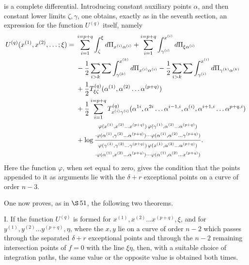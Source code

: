 \documentclass[10pt]{article}
\begin{document}
is a complete differential. Introducing constant auxiliary points \(\alpha\), and then constant lower limits \(\zeta,\gamma\), one obtains, exactly as in the seventh section, an expression for the function \(U^{(q)}\) itself, namely
\[
\begin{aligned}
U^{(q)}(x^{(1)},x^{(2)},\ldots;\xi)
={}&
\sum_{i=1}^{i=p+q}\int_{\zeta}^{\xi}d\Pi_{x^{(i)}\alpha^{(i)}}
+\sum_{i=1}^{i=p+q}\int_{\gamma^{(i)}}^{x^{(i)}}d\Pi_{\xi\alpha^{(i)}}\\
&-\frac12\sum_{i>k}\sum\int_{\gamma^{(k)}}^{x^{(k)}}d\Pi_{x^{(i)}\alpha^{(i)}}
-\frac12\sum_{i>k}\sum\int_{\gamma^{(i)}}^{x^{(i)}}d\Pi_{\gamma^{(k)}\alpha^{(k)}}\\
&+\frac12 T_{\xi\zeta}^{(q)}(\alpha^{(1)},\alpha^{(2)}\ldots\alpha^{(p+q)})\\
&+\frac12\sum_{i=1}^{i=p+q}
T_{x^{(i)}\gamma^{(i)}}^{(q)}
(\alpha^{1i},\alpha^{2i}\ldots\alpha^{i-1,i},\alpha^{(i)},\alpha^{i+1,i}\ldots\alpha^{p+q,i})\\
&+\log\frac{%
\begin{gathered}\scriptstyle
\varphi(x^{(1)},x^{(2)}\ldots x^{(p+q)})\,
\varphi(\gamma^{(1)},\alpha^{(2)}\ldots\alpha^{(p+q)})\\[-0.15em]
\scriptstyle{}\cdot
\varphi(\alpha^{(1)},\gamma^{(2)}\ldots\alpha^{(p+q)})\cdots
\varphi(\alpha^{(1)},\alpha^{(2)}\ldots\gamma^{(p+q)})
\end{gathered}}{%
\begin{gathered}\scriptstyle
\varphi(\gamma^{(1)},\gamma^{(2)}\ldots\gamma^{(p+q)})\,
\varphi(x^{(1)},\alpha^{(2)}\ldots\alpha^{(p+q)})\\[-0.15em]
\scriptstyle{}\cdot
\varphi(\alpha^{(1)},x^{(2)}\ldots\alpha^{(p+q)})\cdots
\varphi(\alpha^{(1)},\alpha^{(2)}\ldots x^{(p+q)})
\end{gathered}}.
\end{aligned}
\]
Here the function \(\varphi\), when set equal to zero, gives the condition that the points appended to it as arguments lie with the \(\delta+r\) exceptional points on a curve of order \(n-3\).

One now proves, as in \(\S\,51\), the following two theorems.

I. If the function \(U^{(q)}\) is formed for \(x^{(1)},x^{(2)}\ldots x^{(p+q)}, \xi\), and for \(y^{(1)},y^{(2)}\ldots y^{(p+q)}, \eta\), where the \(x,y\) lie on a curve of order \(n-2\) which passes through the separated \(\delta+r\) exceptional points and through the \(n-2\) remaining intersection points of \(f=0\) with the line \(\xi\eta\), then, with a suitable choice of integration paths, the same value or the opposite value is obtained both times.
\end{document}
